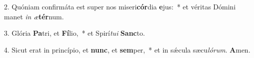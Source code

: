 2. Quóniam confirmáta est super nos miseri\textbf{cór}dia \textbf{e}jus:~*  et véritas Dómini manet \textit{in} \textit{æ}\textbf{tér}num.\

3. Glória \textbf{Pa}tri, et \textbf{Fí}lio,~*  et Spirí\textit{tu}\textit{i} \textbf{Sanc}to.\

4. Sicut erat in princípio, et \textbf{nunc}, et \textbf{sem}per,~*  et in sǽcula sæcu\textit{ló}\textit{rum}. \textbf{A}men.\

